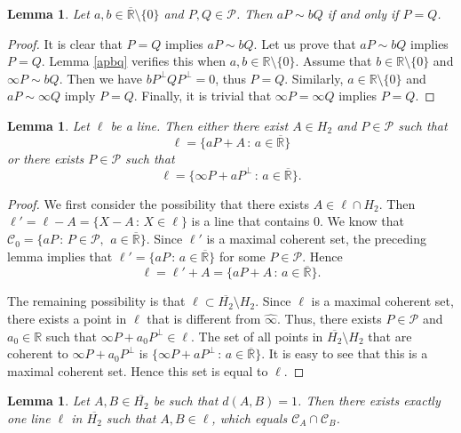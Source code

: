 \documentclass[10pt]{amsart}
\newtheorem{lemma}[theorem]{Lemma}
\theoremstyle{definition}
\theoremstyle{remark}
\numberwithin{subsection}{section}
\numberwithin{equation}{section}
\newcommand\cC{{\mathcal{C}}}
\newcommand\oH{{\overline{H_2}}}
\newcommand\oi{{\widehat{\infty}}}
\newcommand\oR{{\overline{\mathbb{R}}}}
\begin{document}
\begin{lemma}\label{pq}
Let $a,b \in {\oR}\setminus\{0\}$ and $P,Q \in \mathcal{P}$. 
Then $aP \sim bQ$ if and only if $P=Q$.
\end{lemma}
\begin{proof}
It is clear that $P=Q$ implies $aP \sim bQ$.
Let us prove that $aP \sim bQ$ implies $P=Q$.
Lemma \ref{apbq} verifies this when $a,b\in \mathbb{R}\setminus\{0\}$. 
Assume that $b\in \mathbb{R}\setminus\{0\}$ and $\infty P\sim bQ$. 
Then we have $bP^\perp QP^\perp =0$, thus $P=Q$. 
Similarly, $a\in \mathbb{R}\setminus\{0\}$ and $a P\sim \infty Q$ imply $P=Q$. 
Finally, it is trivial that $\infty P=\infty Q$ implies $P=Q$.
\end{proof}


\begin{lemma}\label{jojhcer}
Let $\ell$ be a line. Then either there exist $A\in H_2$ and $P \in \mathcal{P}$ such that
\[
\ell = \{ aP+A \, : \, a \in \oR \}
\]
or there exists $P \in \mathcal{P}$ such that
\[
\ell = \{ \infty P + aP^\perp \, : \, a \in {\oR}  \}.
\]
\end{lemma}

\begin{proof}
We first consider the possibility that there exists $A \in \ell \cap H_2$. Then $\ell' = \ell - A = \{ X - A \, : \, X \in \ell \}$ is a line that contains $0$. 
We know that $\mathcal{C}_0 = \{ aP \, : \, P \in \mathcal{P}, \ \, a \in {\oR} \}$. Since $\ell'$ is a maximal coherent set, the preceding lemma implies that $\ell' = \{ aP \, : \, a \in {\oR} \}$ for some $P \in \mathcal{P}$. 
Hence 
\[
\ell = \ell' + A =  \{ aP+A \, : \, a \in \oR \}.
\]

The remaining possibility is that $\ell \subset \oH \setminus H_2$. Since $\ell$ is a maximal coherent set, there exists a point in $\ell$ that is different from ${\oi}$. Thus, there exists $P \in \mathcal{P}$ and $a_0 \in \mathbb{R}$ such that $\infty P + a_0 P^\perp \in \ell$. The set of all points in $ \oH \setminus H_2$ that are coherent to $\infty P + a_0 P^\perp$ is $ \{ \infty P + aP^\perp \, : \, a \in {\oR}  \}$. It is easy to see that this is a maximal coherent set. Hence this set is equal to $\ell$.
\end{proof}

\begin{lemma}\label{simpll}
Let $A,B \in \oH$ be such that $d(A,B) = 1$. Then there exists exactly one line $\ell$ in $\oH$ such that $A,B \in \ell$, which equals $\cC_A\cap \cC_B$.
\end{lemma}
\end{document}
